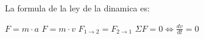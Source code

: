 
\question La formula de la ley de la dinamica es:

  \begin{oneparchoices}
    \CorrectChoice $F=m \cdot a$
    \choice $F=m \cdot v$
    \choice $F_{1 \rightarrow 2} = F_{2 \rightarrow 1}$
    \choice $\Sigma F = 0 \Leftrightarrow \frac{dv}{dt} = 0$
  \end{oneparchoices}
  \answerline[A]
